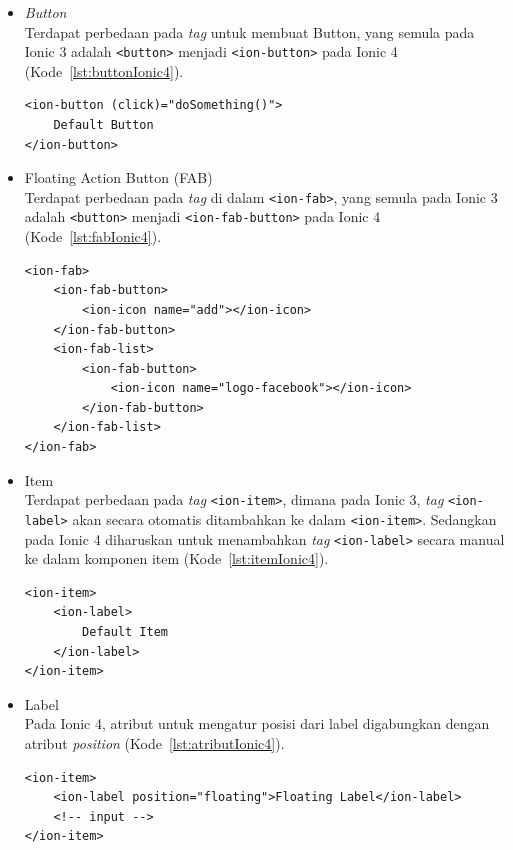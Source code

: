 \begin{enumerate}
\begin{enumerate}
\begin{itemize}
			\begin{itemize}
				\item {\it Button} \\
				Terdapat perbedaan pada {\it tag} untuk membuat Button, yang semula pada Ionic 3 adalah \texttt{<button>} menjadi \texttt{<ion-button>} pada Ionic 4 (Kode~\ref{lst:buttonIonic4}).
				\begin{lstlisting}[label={lst:buttonIonic4}, caption=Penggunaan Button pada Ionic 4]
<ion-button (click)="doSomething()">
	Default Button
</ion-button>
				\end{lstlisting}

				\item Floating Action Button (FAB) \\
				Terdapat perbedaan pada {\it tag} di dalam \texttt{<ion-fab>}, yang semula pada Ionic 3 adalah \texttt{<button>} menjadi \texttt{<ion-fab-button>} pada Ionic 4 (Kode~\ref{lst:fabIonic4}).

\begin{lstlisting}[label={lst:fabIonic4}, caption=Penggunaan Floating Action Button pada Ionic 4]
<ion-fab>
	<ion-fab-button>
		<ion-icon name="add"></ion-icon>
	</ion-fab-button>
	<ion-fab-list>
		<ion-fab-button>
			<ion-icon name="logo-facebook"></ion-icon>
		</ion-fab-button>
	</ion-fab-list>
</ion-fab>
\end{lstlisting}
				
				\item Item \\
				Terdapat perbedaan pada \textit{tag} \texttt{<ion-item>}, dimana pada Ionic 3, \textit{tag} \texttt{<ion-label>} akan secara otomatis ditambahkan ke dalam \texttt{<ion-item>}. Sedangkan pada Ionic 4 diharuskan untuk menambahkan \textit{tag} \texttt{<ion-label>} secara manual ke dalam komponen item (Kode~\ref{lst:itemIonic4}). 
				
				\begin{lstlisting}[label={lst:itemIonic4}, caption=Penggunaan Item pada Ionic 4]
<ion-item>
	<ion-label>
    	Default Item
	</ion-label>
</ion-item>
				\end{lstlisting}

				\item Label \\
				Pada Ionic 4, atribut untuk mengatur posisi dari label digabungkan dengan atribut {\it position} (Kode~\ref{lst:atributIonic4}).
				\begin{lstlisting}[label={lst:atributIonic4}, caption=Penggunaan Atribut {\it Position} pada Ionic 4]
<ion-item>
	<ion-label position="floating">Floating Label</ion-label>
	<!-- input -->
</ion-item>
				\end{lstlisting}


\end{itemize}
\end{itemize}
\end{enumerate}
\end{enumerate}
